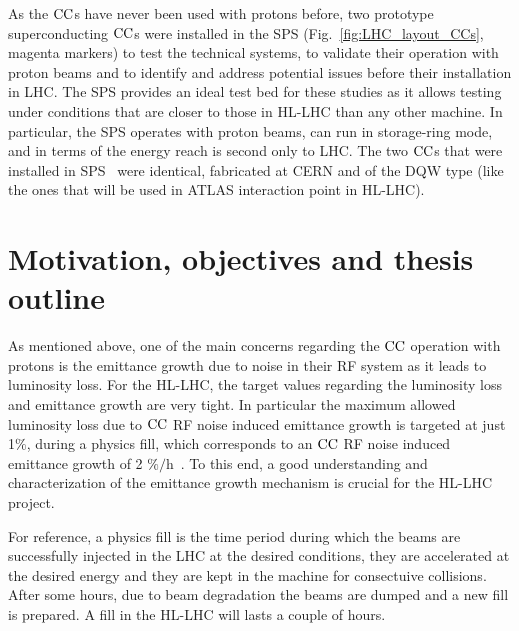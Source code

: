 
As the ${\mathrm{CC}}$s have never been used with protons before, two prototype superconducting ${\mathrm{CC}}$s were installed in the SPS (Fig.~\ref{fig:LHC_layout_CCs}, magenta markers) to test the technical systems, to validate their operation with proton beams and to identify and address potential issues before their installation in LHC. The SPS  provides an ideal test bed for these studies as it allows testing under conditions that are closer to those in HL-LHC than any other machine. In particular, the SPS operates with proton beams, can run in storage-ring mode, and in terms of the energy reach is second only to LHC. The two ${\mathrm{CC}}$s that were installed in SPS~\cite{Zanoni:2017} were identical, fabricated at CERN and of the DQW type (like the ones that will be used in ATLAS interaction point in HL-LHC).


\section{Motivation, objectives and thesis outline}\label{sec:motivation_outline}

As mentioned above, one of the main concerns regarding the ${\mathrm{CC}}$ operation with protons is the emittance growth due to noise in their RF system as it leads to luminosity loss. For the HL-LHC, the target values regarding the luminosity loss and emittance growth are very tight. In particular the maximum allowed luminosity loss due to ${\mathrm{CC}}$ RF noise induced emittance growth is targeted at just 1$\%$, during a physics fill, which corresponds to an ${\mathrm{CC}}$ RF noise induced emittance growth of 2 $\mathrm{\%/h}$~\cite{MedinaMedrano:2301928, CC_lumi_limits_philippe, CC_lumi_limits_ilias}. To this end, a good understanding and characterization of the emittance growth mechanism is crucial for the HL-LHC project.

For reference, a physics fill is the time period during which the beams are successfully injected in the LHC at the desired conditions, they are accelerated at the desired energy and they are kept in the machine for consectuive collisions. After some hours, due to beam degradation the beams are dumped and a new fill is prepared. A fill in the HL-LHC will lasts a couple of hours. 

